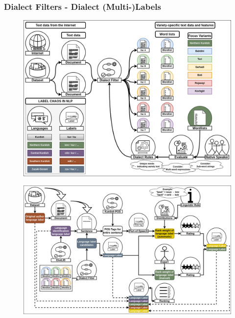 \documentclass[aspectratio=169]{beamer}
\begin{document}
\begin{frame}[fragile]
	\frametitle{Dialect Filters - Dialect (Multi-)Labels}
    \begin{minipage}{.50\textwidth}
    \begin{figure}
        \centering
        \includegraphics[width=1.0\textwidth]{images/DialectFilters-Overview.png} 
    \end{figure}
    \end{minipage}%
    \begin{minipage}{.50\textwidth}
    \begin{figure}
        \centering
        \includegraphics[width=1.0\textwidth]{images/DialectFilters-PipelineOverview.png} 
    \end{figure}
    \end{minipage}
\end{frame}
\end{document}

